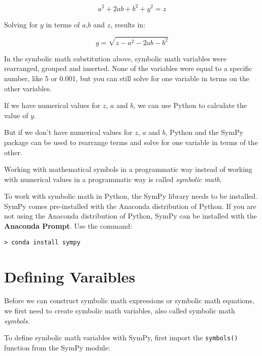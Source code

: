 \documentclass{book}
\newcommand{\passthrough}[1]{#1}
\begin{document}
\[ a^{2} + 2ab + b^{2} + y^{2} = z \]

Solving for \(y\) in terms of \(a\),\(b\) and \(z\), results in:

\[ y = \sqrt{z - a^{2} - 2ab - b^{2}} \]

In the symbolic math substitution above, symbolic math variables were
rearranged, grouped and inserted. None of the variables were equal to a
specific number, like 5 or 0.001, but you can still solve for one
variable in terms on the other variables.
    




    
        If we have numerical values for \(z\), \(a\) and \(b\), we can use
Python to calculate the value of \(y\).

But if we don't have numerical values for \(z\), \(a\) and \(b\), Python
and the SymPy package can be used to rearrange terms and solve for one
variable in terms of the other.

Working with mathematical symbols in a programmatic way instead of
working with numerical values in a programmatic way is called
\emph{symbolic math}.
    




    
        To work with symbolic math in Python, the SymPy library needs to be
installed. SymPy comes pre-installed with the Anaconda distribution of
Python. If you are not using the Anaconda distribution of Python, SymPy
can be installed with the \textbf{Anaconda Prompt}. Use the command:

\begin{lstlisting}
> conda install sympy
\end{lstlisting}
    




    
        \hypertarget{defining-varaibles}{%
\section{Defining Varaibles}\label{defining-varaibles}}
    




    
        Before we can construct symbolic math expressions or symbolic math
equations, we first need to create symbolic math variables, also called
symbolic math \emph{symbols}.

To define symbolic math variables with SymPy, first import the
\passthrough{\lstinline!symbols()!} function from the SymPy module:
    
\end{document}
